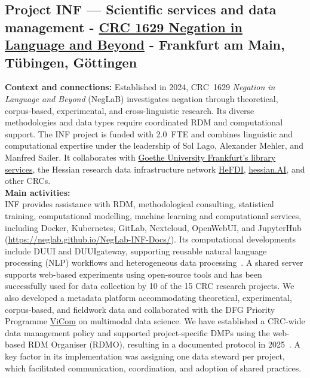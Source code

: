 \documentclass{eceasst}
\begin{document}
\subsection{Project INF --- Scientific services and data management - \href{https://gepris.dfg.de/gepris/projekt/537324246?language=en}{CRC 1629 Negation in Language and Beyond} - Frankfurt am Main, Tübingen, Göttingen}
\label{subsec:crc1629}
\textbf{Context and connections:} Established in 2024, CRC~1629 \textit{Negation in Language and Beyond} (NegLaB) investigates negation through theoretical, corpus-based, experimental, and cross-linguistic research. Its diverse methodologies and data types require coordinated RDM and computational support.
The INF project is funded with 2.0~FTE
and combines linguistic and computational
expertise under the leadership of Sol Lago,
Alexander Mehler, and Manfred Sailer.
It collaborates with
\href{https://www.ub.uni-frankfurt.de/home_en.html}
{Goethe University Frankfurt's library services},
the Hessian research data infrastructure network
\href{https://www.uni-marburg.de/en/hefdi}{HeFDI},
\href{https://www.hessian.ai/}{hessian.AI},
and other CRCs.
\\
\textbf{Main activities:} \\
INF provides assistance with RDM, methodological consulting, statistical training, computational modelling, machine learning and computational services, including Docker, Kubernetes, GitLab, Nextcloud, OpenWebUI, and JupyterHub (\url{https://neglab.github.io/NegLab-INF-Docs/}). Its computational developments include DUUI and DUUIgateway, supporting reusable natural language processing (NLP) workflows and heterogeneous data processing~\cite{Leonhardt:et:al:2023,Abrami:et:al:2025:a,Hammerla:et:al:2025a,Bundan:Abrami:Mehler:2025,Borkowski:et:al:2026}.
A shared server supports web-based experiments using open-source tools and has been successfully used for data collection by 10 of the 15 CRC research projects.
We also developed a metadata platform accommodating theoretical, experimental, corpus-based, and fieldwork data and collaborated with the DFG Priority Programme \href{https://vicom.info/}{ViCom} on multimodal data science.
We have established a CRC-wide data management policy and supported project-specific DMPs using the web-based RDM Organiser (RDMO), resulting in a documented protocol in 2025~\cite{Bahmanian:et:al:2025}. A key factor in its implementation was assigning one data steward per project, which facilitated communication, coordination, and adoption of shared practices.
\end{document}

